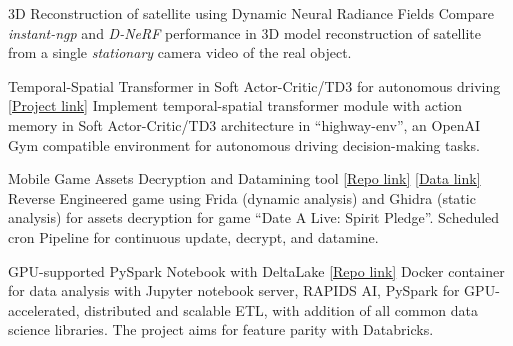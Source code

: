 \vspace{-4mm}
\vspace{-2mm}

\begin{cventries}


	\cventry
	{}
	{3D Reconstruction of satellite using Dynamic Neural Radiance Fields}
	{}
	{}
	{Compare \emph{instant-ngp} and \emph{D-NeRF} performance in 3D model reconstruction of satellite from a single \emph{stationary} camera video of the real object.}

	\cventry
	{}
	{Temporal-Spatial Transformer in Soft Actor-Critic/TD3 for autonomous driving}
	{\href{https://github.com/sesem738/Lavenza}{[Project link]}}
	{}
	{Implement temporal-spatial transformer module with action memory in Soft Actor-Critic/TD3 architecture in ``highway-env'', an OpenAI Gym compatible environment for autonomous driving decision-making tasks.}

	\cventry
	{}
	{Mobile Game Assets Decryption and Datamining tool}
	{\href{https://github.com/n0k0m3/DALSP-Assets-Decryption-tool}{[Repo link]} \href{https://github.com/n0k0m3/DateALiveData}{[Data link]}}
	{}
	{Reverse Engineered game using Frida (dynamic analysis) and Ghidra (static analysis) for assets decryption for game ``Date A Live: Spirit Pledge''. Scheduled cron Pipeline for continuous update, decrypt, and datamine.}

	\cventry
	{}
	{GPU-supported PySpark Notebook with DeltaLake}
	{\href{https://github.com/n0k0m3/pyspark-notebook-deltalake-docker}{[Repo link]}}
	{}
	{Docker container for data analysis with Jupyter notebook server, RAPIDS AI, PySpark for GPU-accelerated, distributed and scalable ETL, with addition of all common data science libraries. The project aims for feature parity with Databricks.}



\end{cventries}
